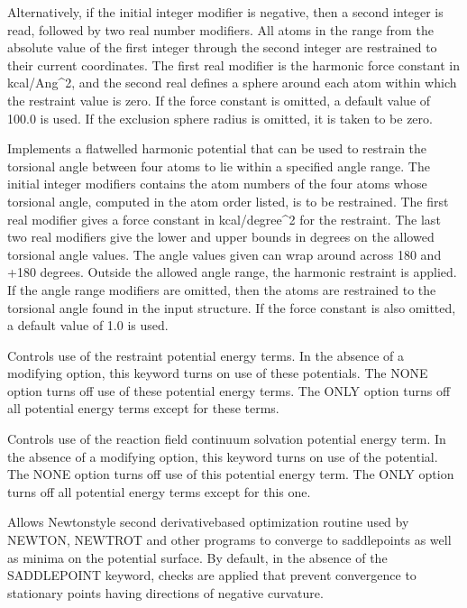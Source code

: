 \documentclass[letterpaper,11pt,english]{sphinxmanual}
\begin{document}
Alternatively, if the initial integer modifier is negative, then a second integer is read, followed by two real number modifiers. All atoms in the range from the absolute value of the first integer through the second integer are restrained to their current coordinates. The first real modifier is the harmonic force constant in kcal/Ang\textasciicircum{}2, and the second real defines a sphere around each atom within which the restraint value is zero. If the force constant is omitted, a default value of 100.0 is used. If the exclusion sphere radius is omitted, it is taken to be zero.

  Implements a flat\sphinxhyphen{}welled harmonic potential that can be used to restrain the torsional angle between four atoms to lie within a specified angle range. The initial integer modifiers contains the atom numbers of the four atoms whose torsional angle, computed in the atom order listed, is to be restrained. The first real modifier gives a force constant in kcal/degree\textasciicircum{}2 for the restraint. The last two real modifiers give the lower and upper bounds in degrees on the allowed torsional angle values. The angle values given can wrap around across \sphinxhyphen{}180 and +180 degrees. Outside the allowed angle range, the harmonic restraint is applied. If the angle range modifiers are omitted, then the atoms are restrained to the torsional angle found in the input structure. If the force constant is also omitted, a default value of 1.0 is used.

  Controls use of the restraint potential energy terms. In the absence of a modifying option, this keyword turns on use of these potentials. The NONE option turns off use of these potential energy terms. The ONLY option turns off all potential energy terms except for these terms.


  Controls use of the reaction field continuum solvation potential energy term. In the absence of a modifying option, this keyword turns on use of the potential. The NONE option turns off use of this potential energy term. The ONLY option turns off all potential energy terms except for this one.

  Allows Newton\sphinxhyphen{}style second derivative\sphinxhyphen{}based optimization routine used by NEWTON, NEWTROT and other programs to converge to saddlepoints as well as minima on the potential surface. By default, in the absence of the SADDLEPOINT keyword, checks are applied that prevent convergence to stationary points having directions of negative curvature.
\end{document}
